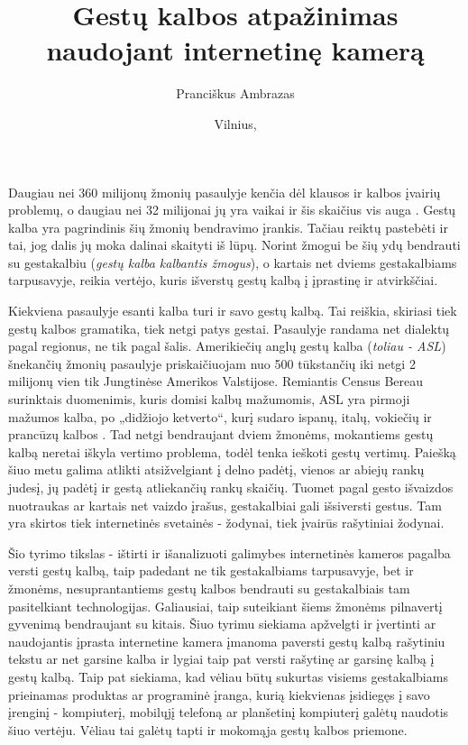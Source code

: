 \documentclass{VUMIFInfKursinis}
\title{Gestų kalbos atpažinimas naudojant internetinę kamerą}
\author{Pranciškus Ambrazas}
\date{Vilnius, \the\year}
\begin{document}
\maketitle

\tableofcontents

Daugiau nei 360 milijonų žmonių pasaulyje kenčia dėl klausos ir kalbos įvairių problemų, o daugiau nei 32 milijonai jų yra vaikai ir šis skaičius vis auga \cite{WhoInt}. Gestų kalba yra pagrindinis šių žmonių bendravimo įrankis. Tačiau reiktų pastebėti ir tai, jog dalis jų moka dalinai skaityti iš lūpų. Norint žmogui be šių ydų bendrauti su gestakalbiu (\textit{gestų kalba kalbantis žmogus}), o kartais net dviems gestakalbiams tarpusavyje, reikia vertėjo, kuris išverstų gestų kalbą į įprastinę ir atvirkščiai.

Kiekviena pasaulyje esanti kalba turi ir savo gestų kalbą. Tai reiškia, skiriasi tiek gestų kalbos gramatika, tiek netgi patys gestai. Pasaulyje randama net dialektų pagal regionus, ne tik pagal šalis. Amerikiečių anglų gestų kalba (\textit{toliau - ASL}) šnekančių žmonių pasaulyje priskaičiuojam nuo 500 tūkstančių iki netgi 2 milijonų vien tik Jungtinėse Amerikos Valstijose. Remiantis Census Bereau surinktais duomenimis, kuris domisi kalbų mažumomis, ASL yra pirmoji mažumos kalba, po „didžiojo ketverto“, kurį sudaro ispanų, italų, vokiečių ir prancūzų kalbos \cite{GUL}. Tad netgi bendraujant dviem žmonėms, mokantiems gestų kalbą neretai iškyla vertimo problema, todėl tenka ieškoti gestų vertimų. Paiešką šiuo metu galima atlikti atsižvelgiant į delno padėtį, vienos ar abiejų rankų judesį, jų padėtį ir gestą atliekančių rankų skaičių. Tuomet pagal gesto išvaizdos nuotraukas ar kartais net vaizdo įrašus, gestakalbiai gali išsiversti gestus. Tam yra skirtos tiek internetinės svetainės - žodynai, tiek įvairūs rašytiniai žodynai.



Šio tyrimo tikslas - ištirti ir išanalizuoti galimybes internetinės kameros pagalba versti gestų kalbą, taip padedant ne tik gestakalbiams tarpusavyje, bet ir žmonėms, nesuprantantiems gestų kalbos bendrauti su gestakalbiais tam pasitelkiant technologijas. Galiausiai, taip suteikiant šiems žmonėms pilnavertį gyvenimą bendraujant su kitais. Šiuo tyrimu siekiama apžvelgti ir įvertinti ar naudojantis įprasta internetine kamera įmanoma paversti gestų kalbą rašytiniu tekstu ar net garsine kalba ir lygiai taip pat versti rašytinę ar garsinę kalbą į gestų kalbą. Taip pat siekiama, kad vėliau būtų sukurtas visiems gestakalbiams prieinamas produktas ar programinė įranga, kurią kiekvienas įsidiegęs į savo įrenginį - kompiuterį, mobilųjį telefoną ar planšetinį kompiuterį galėtų naudotis šiuo vertėju. Vėliau tai galėtų tapti ir mokomąja gestų kalbos priemone. 
\end{document}
